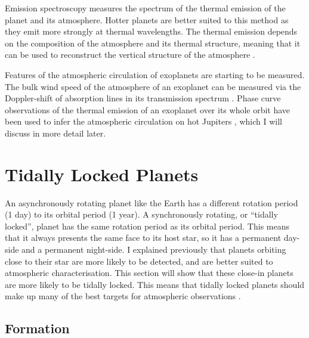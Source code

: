 Emission spectroscopy measures the spectrum of the thermal emission of the planet and its atmosphere. Hotter planets are better suited to this method as they emit more strongly at thermal wavelengths. The thermal emission depends on the composition of the atmosphere and its thermal structure, meaning that it can be used to reconstruct the vertical structure of the atmosphere \citep{stevenson2014thermal}.

Features of the atmospheric circulation of exoplanets are starting to be measured. The bulk wind speed of the atmosphere of an exoplanet can be measured via the Doppler-shift of absorption lines in its transmission spectrum \citep{louden2015spatially, brogi2016rotation}. Phase curve observations of the thermal emission of an exoplanet over its whole orbit have been used to infer the atmospheric circulation on hot Jupiters \citep{zellem2014hd209, parmentier2017handbook}, which I will discuss in more detail later.


\section{Tidally Locked Planets}

An asynchronously rotating planet like the Earth has a different rotation period (1 day) to its orbital period (1 year). A synchronously rotating, or ``tidally locked'', planet has the same rotation period as its orbital period. This means that it always presents the same face to its host star, so it has a permanent day-side and a permanent night-side. I explained previously that planets orbiting close to their star are more likely to be detected, and are better suited to atmospheric characterisation. This section will show that these close-in planets are more likely to be tidally locked. This means that tidally locked planets should make up many of the best targets for atmospheric observations \citep{crossfield2015observations}.



\subsection{Formation}


